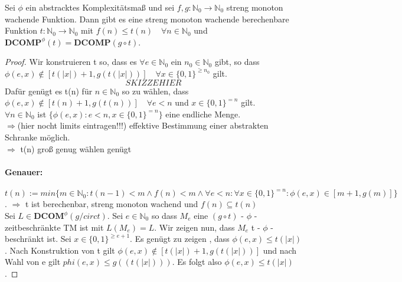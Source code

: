     Sei \(\phi\) ein abstracktes Komplexitätsmaß und sei \(f, g : \mathbb{N}_0 \to \mathbb{N}_0\) streng monoton wachende Funktion. Dann gibt es eine streng monoton wachende berechenbare Funktion \(t : \mathbb{N}_0 \to \mathbb{N}_0\) mit \(f(n) \leq t(n) \quad \forall n \in \mathbb{N}_0\) und \(\textbf{DCOMP}^{\phi}(t) = \textbf{DCOMP}(g \circ t)\).
    \begin{proof}
        Wir konstruieren t so, dass es \(\forall e \in \mathbb{N}_0\) ein \(n_0 \in \mathbb{N}_0\) gibt, so dass \(\phi(e, x) \not \in [t(|x|) + 1, g(t(|x|))] \quad \forall x \in \{0, 1\}^{\geq n_0}\) gilt.
        \[SKIZZE HIER \]
        Dafür genügt es t(n) für \(n \in \mathbb{N}_0\) so zu wählen, dass \(\phi (e,x) \not \in [t(n) + 1, g(t(n))] \quad \forall e < n\) und \(x \in \{0, 1\}^{= n}\) gilt.\\
        \(\forall n \in \mathbb{N}_0\) ist \(\{\phi(e,x) : e < n, x \in \{0, 1\}^{=n}\}\) eine endliche Menge.\\
        \(\Rightarrow\)(hier nocht limits eintragen!!!) effektive Bestimmung einer abstrakten Schranke möglich.\\
        \(\Rightarrow\) t(n) groß genug wählen genügt
        \paragraph{Genauer:}
            \(t(n) := min \{m \in \mathbb{N}_0 : t(n-1)<m \wedge f(n) < m \wedge \forall e < n : \forall x \in \{0, 1\}^{=n} : \phi(e,x) \in [m+1, g(m)]\}\).
            \(\Rightarrow\) t ist berechenbar, streng monoton wachend und \(f(n) \subseteq t(n)\)\\
            Sei \(L \in \textbf{DCOM}^{\phi}(g /circ t)\). Sei \(e \in \mathbb{N}_0\) so dass \(M_e\) eine \((g \circ t)\) - \(\phi\) - zeitbeschränkte TM ist mit \(L(M_e) = L\). Wir zeigen nun, dass \(M_e\) t - \(\phi\) - beschränkt ist. Sei \(x \in \{0, 1\}^{\geq e + 1}\). Es genügt zu zeigen , dass \(\phi (e, x) \leq t (|x|)\). Nach Konstruktion von t gilt \(\phi (e, x) \not \in [t(|x|) + 1, g(t(|x|))]\) und nach Wahl von e gilt \(phi (e, x) \leq g ((t(|x|)))\). Es folgt also \(\phi(e,x) \leq t(|x|)\).
    \end{proof}